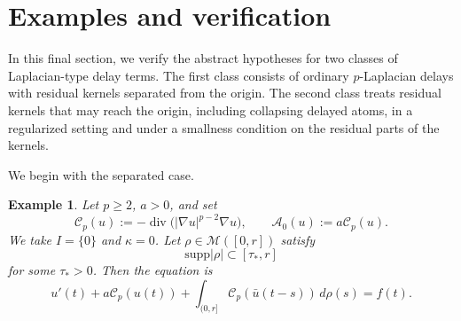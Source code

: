 \documentclass[a4paper,11pt,oneside,reqno]{amsart}
\newtheorem{example}[theorem]{Example}
\newcounter{c}
\newcounter{d}
\newcounter{b}
\newcommand{\supp}{\mathrm{supp}}
\newcommand{\diver}{\operatorname{div}}
\newcommand{\M}{\mathcal{M}}
\begin{document}
\section{Examples and verification}
\label{sec:examples}

In this final section, we verify the abstract hypotheses for two classes of
Laplacian-type delay terms. The first class consists of ordinary
\(p\)-Laplacian delays with residual kernels separated from the origin.
The second class treats residual kernels that may reach the origin, including
collapsing delayed atoms, in a regularized setting and under a smallness
condition on the residual parts of the kernels.

We begin with the separated case.

\begin{example}
\label{ex:p-laplace-separated}
Let \(p\ge2\), \(a>0\), and set
\[
 \mathcal C_p(u):=
 -\diver\bigl(|\nabla u|^{p-2}\nabla u\bigr),
 \qquad
 \mathcal A_0(u):=a\mathcal C_p(u).
\]
We take \(I=\{0\}\) and \(\kappa=0\). Let
\(\rho\in\M([0,r])\) satisfy
\[
 \supp|\rho|\subset[\tau_*,r]
\]
for some \(\tau_*>0\). Then the equation is
\[
 u'(t)+a\mathcal C_p(u(t))
 +\int_{(0,r]}\mathcal C_p(\bar u(t-s))\,d\rho(s)=f(t).
\]


\end{example}
\end{document}
